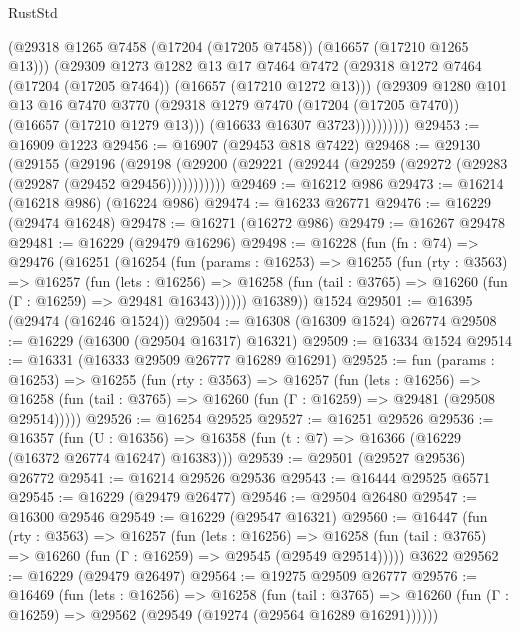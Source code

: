 \begin{lexlean}{RustStd}
\begin{coremodule}
                  (@29318 @1265 @7458 (@17204 (@17205 @7458)) (@16657 (@17210 @1265 @13)))
                  (@29309
                    @1273
                    @1282
                    @13
                    @17
                    @7464
                    @7472
                    (@29318 @1272 @7464 (@17204 (@17205 @7464)) (@16657 (@17210 @1272 @13)))
                    (@29309
                      @1280
                      @101
                      @13
                      @16
                      @7470
                      @3770
                      (@29318 @1279 @7470 (@17204 (@17205 @7470)) (@16657 (@17210 @1279 @13)))
                      (@16633 @16307 @3723))))))))))
@29453 := @16909 @1223
@29456 := @16907 (@29453 @818 @7422)
@29468 := @29130
    (@29155
      (@29196
        (@29198 (@29200 (@29221 (@29244 (@29259 (@29272 (@29283 (@29287 (@29452 @29456)))))))))))
@29469 := @16212 @986
@29473 := @16214 (@16218 @986) (@16224 @986)
@29474 := @16233 @26771
@29476 := @16229 (@29474 @16248)
@29478 := @16271 (@16272 @986)
@29479 := @16267 @29478
@29481 := @16229 (@29479 @16296)
@29498 := @16228
    (fun (fn : @74) =>
    @29476
      (@16251
        (@16254
          (fun (params : @16253) =>
          @16255
            (fun (rty : @3563) =>
            @16257
              (fun (lets : @16256) =>
              @16258 (fun (tail : @3765) => @16260 (fun (Γ : @16259) => @29481 @16343))))))
        @16389))
    @1524
@29501 := @16395 (@29474 (@16246 @1524))
@29504 := @16308 (@16309 @1524) @26774
@29508 := @16229 (@16300 (@29504 @16317) @16321)
@29509 := @16334 @1524
@29514 := @16331 (@16333 @29509 @26777 @16289 @16291)
@29525 := fun (params : @16253) =>
  @16255
    (fun (rty : @3563) =>
    @16257
      (fun (lets : @16256) =>
      @16258 (fun (tail : @3765) => @16260 (fun (Γ : @16259) => @29481 (@29508 @29514)))))
@29526 := @16254 @29525
@29527 := @16251 @29526
@29536 := @16357
    (fun (U : @16356) => @16358 (fun (t : @7) => @16366 (@16229 (@16372 @26774 @16247) @16383)))
@29539 := @29501 (@29527 @29536) @26772
@29541 := @16214 @29526 @29536
@29543 := @16444 @29525 @6571
@29545 := @16229 (@29479 @26477)
@29546 := @29504 @26480
@29547 := @16300 @29546
@29549 := @16229 (@29547 @16321)
@29560 := @16447
    (fun (rty : @3563) =>
    @16257
      (fun (lets : @16256) =>
      @16258 (fun (tail : @3765) => @16260 (fun (Γ : @16259) => @29545 (@29549 @29514)))))
    @3622
@29562 := @16229 (@29479 @26497)
@29564 := @19275 @29509 @26777
@29576 := @16469
    (fun (lets : @16256) =>
    @16258
      (fun (tail : @3765) =>
      @16260 (fun (Γ : @16259) => @29562 (@29549 (@19274 (@29564 @16289 @16291))))))

\end{coremodule}
\end{lexlean}
